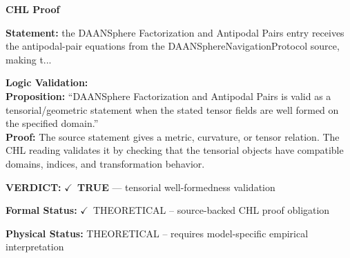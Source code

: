 \vspace{0.45em}
\noindent\textbf{CHL Proof}\par
\textbf{Statement:} the DAANSphere Factorization and Antipodal Pairs entry receives the antipodal-pair
equations from the DAANSphereNavigationProtocol source, making t...

\textbf{Logic Validation:}\\
\textbf{Proposition:} ``DAANSphere Factorization and Antipodal Pairs is valid as a tensorial/geometric statement
when the stated tensor fields are well formed on the specified domain.''\\
\textbf{Proof:} The source statement gives a metric, curvature, or tensor relation. The CHL reading
validates it by checking that the tensorial objects have compatible domains, indices,
and transformation behavior.

\textbf{VERDICT:} \ensuremath{\checkmark}\ \textbf{TRUE} --- tensorial well-formedness validation

\textbf{Formal Status:} \ensuremath{\checkmark}\ THEORETICAL -- source-backed CHL proof obligation

\textbf{Physical Status:} THEORETICAL -- requires model-specific empirical interpretation
\par\vspace{0.45em}
\par
\ifTZPDarkEdition
{}
\fi
\endgroup
\endgroup
